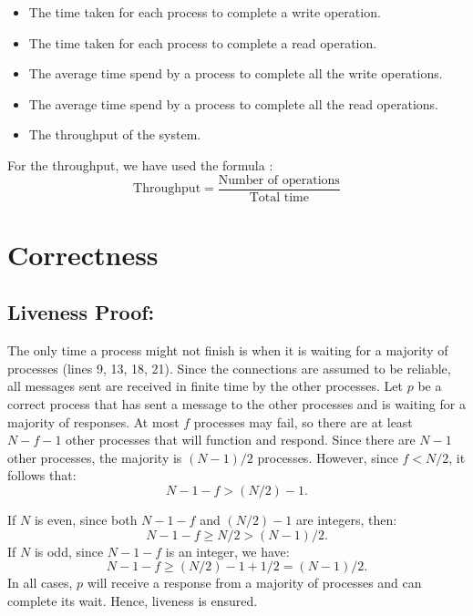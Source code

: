 \begin{itemize}
    \item The time taken for each process to complete a write operation.
    \item The time taken for each process to complete a read operation.
    \item The average time spend by a process to complete all the write operations.
    \item The average time spend by a process to complete all the read operations.
    \item The throughput of the system.
\end{itemize}

For the throughput, we have used the formula :
$$
\text{Throughput} = \frac{\text{Number of operations}}{\text{Total time}}
$$

\newpage
\section{Correctness}

\subsection{Liveness Proof:}
The only time a process might not finish is when it is waiting for a majority of processes (lines 9, 13, 18, 21). Since the connections are assumed to be reliable, all messages sent are received in finite time by the other processes. Let $p$ be a correct process that has sent a message to the other processes and is waiting for a majority of responses. At most $f$ processes may fail, so there are at least $N - f - 1$ other processes that will function and respond. Since there are $N - 1$ other processes, the majority is $(N - 1)/2$ processes. However, since $f < N/2$, it follows that:
\[
N - 1 - f > (N / 2) - 1.
\]

If $N$ is even, since both $N - 1 - f$ and $(N / 2) - 1$ are integers, then:
\[
N - 1 - f \geq N / 2 > (N - 1) / 2.
\]
If $N$ is odd, since $N - 1 - f$ is an integer, we have:
\[
N - 1 - f \geq (N / 2) - 1 + 1/2 = (N - 1) / 2.
\]
In all cases, $p$ will receive a response from a majority of processes and can complete its wait. Hence, liveness is ensured.


